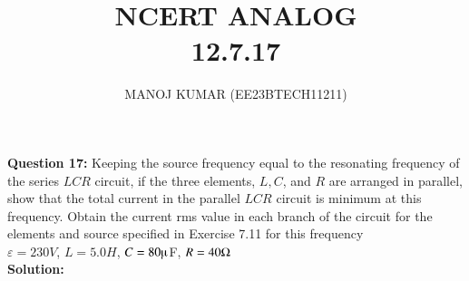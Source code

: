 \documentclass[journal,12pt,twocolumn]{IEEEtran}
\theoremstyle{remark}
\begin{document}

\vspace{3cm}

\title{NCERT ANALOG \\12.7.17}
\author{MANOJ KUMAR (EE23BTECH11211)}
\maketitle
\newpage

\bigskip

\renewcommand{\thefigure}{\theenumi}
\renewcommand{\thetable}{\theenumi}
\textbf{Question 17:}
Keeping the source frequency equal to the resonating frequency of the series $LCR$ circuit, if the three elements, $L, C$, and $R$ are arranged in parallel, show that the total current in the parallel $LCR$ circuit is minimum at this frequency. Obtain the current rms value in each branch of the circuit for the elements and source specified in Exercise 7.11 for this frequency\\
   $\varepsilon =230V$, $L=5.0H$, $C=80\micro$F, $R=40\ohm$\\

    
\textbf{Solution:}\\
\fi
\\
\\
\end{document}
